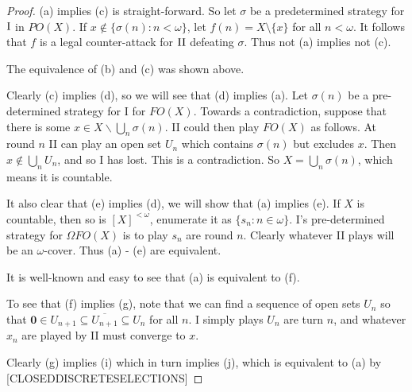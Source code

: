 \documentclass[11pt]{article}
\theoremstyle{plain}
\theoremstyle{definition}
\theoremstyle{remark}
\theoremstyle{plain}
\theoremstyle{definition}
\theoremstyle{remark}
\begin{document}
\begin{proof}
(a) implies (c) is straight-forward. So let
\(\sigma\) be a predetermined strategy for \(\mathrm{I}\) in \(PO(X)\).
If \(x\not\in\{\sigma(n):n<\omega\}\), let \(f(n)=X\setminus\{x\}\)
for all \(n<\omega\). It follows that \(f\) is a legal
counter-attack for \(\mathrm{II}\) defeating \(\sigma\). Thus not (a) implies
not (c).

The equivalence of (b) and (c) was shown above.

Clearly (c) implies (d), so we will see that (d) implies (a).
Let \(\sigma(n)\) be a pre-determined strategy for I for \(FO(X)\).
Towards a contradiction, suppose that there is some \(x \in X \smallsetminus \bigcup_n \sigma(n)\).
II could then play \(FO(X)\) as follows.
At round \(n\) II can play an open set \(U_n\) which contains \(\sigma(n)\) but excludes \(x\).
Then \(x \notin \bigcup_n U_n\), and so I has lost.
This is a contradiction.
So \(X = \bigcup_n \sigma(n)\), which means it is countable.

It also clear that (e) implies (d), we will show that (a) implies (e).
If \(X\) is countable, then so is \([X]^{<\omega}\), enumerate it as \(\{s_n : n \in \omega\}\).
I's pre-determined strategy for \(\Omega FO(X)\) is to play \(s_n\) are round \(n\).
Clearly whatever II plays will be an \(\omega\)-cover.
Thus (a) - (e) are equivalent.

It is well-known and easy to see that (a) is equivalent to (f).

To see that (f) implies (g), note that we can find a sequence of open sets \(U_n\) so that \(\mathbf 0 \in U_{n+1} \subseteq \overline{U_{n+1}} \subseteq U_n\) for all \(n\).
I simply plays \(U_n\) are turn \(n\), and whatever \(x_n\) are played by II must converge to \(x\).

Clearly (g) implies (i) which in turn implies (j), which is
equivalent to (a) by [CLOSEDDISCRETESELECTIONS] 


\end{proof}
\end{document}
